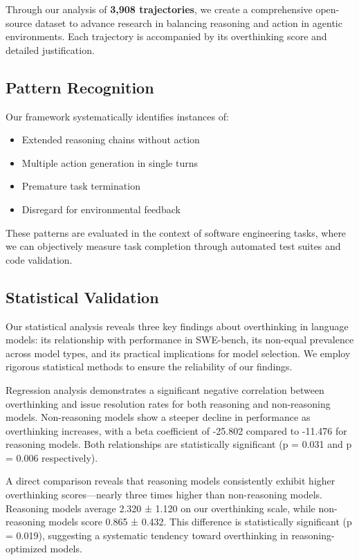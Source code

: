 Through our analysis of \textbf{3,908 trajectories}, we create a comprehensive open-source dataset to advance research in balancing reasoning and action in agentic environments. Each trajectory is accompanied by its overthinking score and detailed justification.

\subsection{Pattern Recognition}
Our framework systematically identifies instances of:
\begin{itemize}
    \item Extended reasoning chains without action
    \item Multiple action generation in single turns
    \item Premature task termination
    \item Disregard for environmental feedback
\end{itemize}

These patterns are evaluated in the context of software engineering tasks, where we can objectively measure task completion through automated test suites and code validation.

\subsection{Statistical Validation}
Our statistical analysis reveals three key findings about overthinking in language models: its relationship with performance in SWE-bench, its non-equal prevalence across model types, and its practical implications for model selection. We employ rigorous statistical methods to ensure the reliability of our findings.

Regression analysis demonstrates a significant negative correlation between overthinking and issue resolution rates for both reasoning and non-reasoning models. Non-reasoning models show a steeper decline in performance as overthinking increases, with a beta coefficient of -25.802 compared to -11.476 for reasoning models. Both relationships are statistically significant (p = 0.031 and p = 0.006 respectively).

A direct comparison reveals that reasoning models consistently exhibit higher overthinking scores—nearly three times higher than non-reasoning models. Reasoning models average 2.320 ± 1.120 on our overthinking scale, while non-reasoning models score 0.865 ± 0.432. This difference is statistically significant (p = 0.019), suggesting a systematic tendency toward overthinking in reasoning-optimized models.

